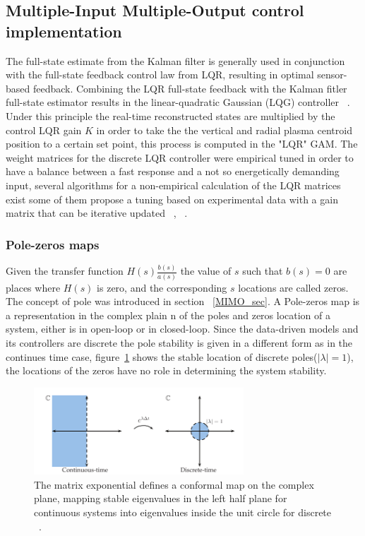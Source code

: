 \subsection{Multiple-Input Multiple-Output control implementation}



The full-state estimate from the Kalman filter is generally used in conjunction with the
full-state feedback control law from LQR, resulting in optimal sensor-based feedback. Combining the LQR full-state feedback with the Kalman fitler full-state estimator results in the linear-quadratic Gaussian (LQG) controller ~\cite[Chapter~8]{DataDriven2019}. Under this principle the real-time reconstructed states are multiplied by the control LQR gain $K$ in order to take the the vertical and radial plasma centroid position to a certain set point, this process is computed in the "LQR" GAM. The weight matrices for the discrete LQR controller were empirical tuned in order to have a balance between a fast response and a not so energetically demanding input, several algorithms for a non-empirical calculation of the LQR matrices exist some of them propose a tuning based on experimental data with a gain matrix that can be iterative updated ~\cite[Chapter~9]{Franklin1998}, ~\cite{Trimpe2014}.
\smallskip



\subsubsection{Pole-zeros maps}



Given the transfer function $H(s)\frac{b(s)}{a(s)}$ the value of $s$ such that $b(s)=0$ are places where $H(s)$ is zero, and the corresponding $s$ locations are called zeros. The  concept of pole  was introduced in section ~\ref{MIMO_sec}.  A Pole-zeros map is a representation in the complex plain n of the poles and zeros location of a system, either is in open-loop or in closed-loop. Since the data-driven models and its controllers are discrete the pole stability is given in a different form as in the continues time case,  figure~\ref{PoleZeroMap} shows the stable location of discrete poles($|\lambda|=1$),  the locations of the zeros have no role in determining the system stability.\smallskip



\begin{figure}[h]
	\centering
	\includegraphics[width=0.7\textwidth]{Chp5/PolesZerosMaps.png}
	
	\caption{ The matrix exponential defines a conformal map on the complex plane, mapping stable eigenvalues in the left half plane for continuous systems into eigenvalues inside the unit circle for discrete ~\cite[Chapter~8]{DataDriven2019}\label{PoleZeroMap}.}
\end{figure}

